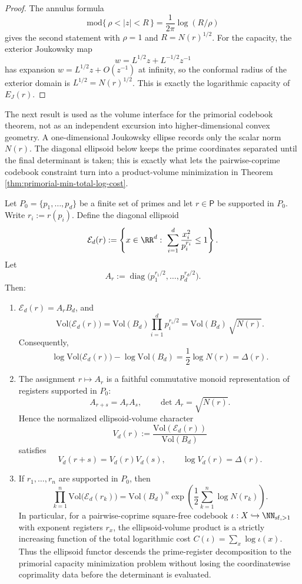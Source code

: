 \begin{proof}
The annulus formula
\[
\mathrm{mod}\{\,\rho<|z|<R\,\}=\frac{1}{2\pi}\log(R/\rho)
\]
gives the second statement with \(\rho=1\) and \(R=N(r)^{1/2}\). For the capacity, the exterior Joukowsky map
\[
w=L^{1/2}z+L^{-1/2}z^{-1}
\]
has expansion \(w=L^{1/2}z+O(z^{-1})\) at infinity, so the conformal radius of the exterior domain is \(L^{1/2}=N(r)^{1/2}\). This is exactly the logarithmic capacity of \(E_J(r)\).
\end{proof}

The next result is used as the volume interface for the primorial codebook theorem, not as an independent excursion into higher-dimensional convex geometry.  A one-dimensional Joukowsky ellipse records only the scalar norm \(N(r)\).  The diagonal ellipsoid below keeps the prime coordinates separated until the final determinant is taken; this is exactly what lets the pairwise-coprime codebook constraint turn into a product-volume minimization in Theorem \ref{thm:primorial-min-total-log-cost}.

\begin{proposition}\label{prop:prime-ellipsoid-volume}
Let \(P_0=\{p_1,\dots,p_d\}\) be a finite set of primes and let \(r\in\mathsf P\) be supported in \(P_0\). Write \(r_i:=r(p_i)\). Define the diagonal ellipsoid
\[
\mathcal E_d(r):=\left\{x\in\RR^d:\ \sum_{i=1}^{d}\frac{x_i^2}{p_i^{r_i}}\le 1\right\}.
\]
Let
\[
A_r:=\operatorname{diag}\bigl(p_1^{r_1/2},\dots,p_d^{r_d/2}\bigr).
\]
Then:
\begin{enumerate}
  \item \(\mathcal E_d(r)=A_rB_d\), and
\[
\mathrm{Vol}\bigl(\mathcal E_d(r)\bigr)
=\mathrm{Vol}(B_d)\prod_{i=1}^{d}p_i^{r_i/2}
=\mathrm{Vol}(B_d)\,\sqrt{N(r)}.
\]
Consequently,
\[
\log\mathrm{Vol}\bigl(\mathcal E_d(r)\bigr)-\log\mathrm{Vol}(B_d)
=\frac12\log N(r)=\Delta(r).
\]

  \item The assignment \(r\mapsto A_r\) is a faithful commutative monoid representation of registers supported in \(P_0\):
  \[
  A_{r+s}=A_rA_s,
  \qquad
  \det A_r=\sqrt{N(r)}.
  \]
  Hence the normalized ellipsoid-volume character
  \[
  V_d(r):=\frac{\mathrm{Vol}(\mathcal E_d(r))}{\mathrm{Vol}(B_d)}
  \]
  satisfies
  \[
  V_d(r+s)=V_d(r)V_d(s),
  \qquad
  \log V_d(r)=\Delta(r).
  \]

  \item If \(r_1,
\dots,r_n\) are supported in \(P_0\), then
  \[
  \prod_{k=1}^{n}\mathrm{Vol}\bigl(\mathcal E_d(r_k)\bigr)
  =\mathrm{Vol}(B_d)^n\exp\!\left(\frac12\sum_{k=1}^{n}\log N(r_k)\right).
  \]
  In particular, for a pairwise-coprime square-free codebook \(\iota:X\hookrightarrow\NN_{\mathrm{sf},>1}\) with exponent registers \(r_x\), the ellipsoid-volume product is a strictly increasing function of the total logarithmic cost \(C(\iota)=\sum_x\log\iota(x)\). Thus the ellipsoid functor descends the prime-register decomposition to the primorial capacity minimization problem without losing the coordinatewise coprimality data before the determinant is evaluated.
\end{enumerate}
\end{proposition}


